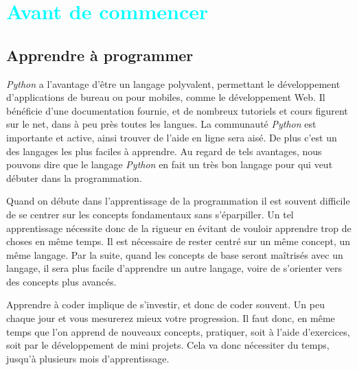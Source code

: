 \documentclass[a4paper,11pt]{book}
\title{\fbox{PYTHON de A à Y}}
\author{krystof}
\date{\today}
\begin{document}
\maketitle
\tableofcontents

\part{\textcolor{cyan}{Avant de commencer}}
\pagestyle{fancy}
\renewcommand{\headrulewidth}{1pt}
\renewcommand{\headsep}{15pt}
\setlength{\headheight}{1cm}
\lhead{\textcolor{cyan}{Chapitre \thechapter}}
\rhead{\thepage}
\cfoot{}
\chapter{Apprendre à programmer}

\textit{Python} a l'avantage d'être un langage polyvalent, permettant le développement d'applications de bureau ou pour mobiles, comme le développement Web. Il bénéficie d'une documentation fournie, et de nombreux tutoriels et cours figurent sur le net, dans à peu près toutes les langues. La communauté \textit{Python} est importante et active, ainsi trouver de l'aide en ligne sera aisé. De plus c'est un des langages les plus faciles à apprendre. Au regard de tels avantages, nous pouvons dire que le langage \textit{Python} en fait un très bon langage pour qui veut débuter dans la programmation.
\medskip

Quand on débute dans l'apprentissage de la programmation il est souvent difficile de se centrer sur les concepts fondamentaux sans s'éparpiller. Un tel apprentissage nécessite donc de la rigueur en évitant de vouloir apprendre trop de choses en même temps. Il est nécessaire de rester centré sur un même concept, un même langage. Par la suite, quand les concepts de base seront maîtrisés avec un langage, il sera plus facile d'apprendre un autre langage, voire de s'orienter vers des concepts plus avancés.
\medskip

Apprendre à coder implique de s'investir, et donc de coder souvent. Un peu chaque jour et vous mesurerez mieux votre progression. Il faut donc, en même temps que l'on apprend de nouveaux concepts, pratiquer, soit à l'aide d'exercices, soit par le développement de mini projets. Cela va donc nécessiter du temps, jusqu'à plusieurs mois d'apprentissage.
\medskip
\end{document}
